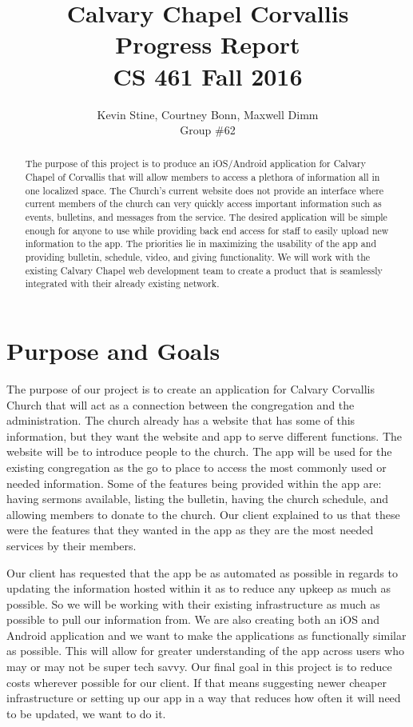 \documentclass[letterpaper,10pt,draftclsnofoot,onecolumn,titlepage]{IEEEtran}
\def\name{Kevin Stine, Courtney Bonn, Maxwell Dimm}
\def\team{Calvary Chapel Corvallis}
\def\grp{Group \#62}
\begin{document}
	\title{\huge \team \\ Progress Report\\ CS 461 Fall 2016}
	\author{\large \name \\ \grp}



	\maketitle

		\begin{abstract}The purpose of this project is to produce an iOS/Android application for Calvary Chapel of Corvallis that will allow members to access a plethora of information all in one localized space.
		The Church's current website does not provide an interface where current members of the church can very quickly access important information such as events, bulletins, and messages from the service.
		The desired application will be simple enough for anyone to use while providing back end access for staff to easily upload new information to the app.
		The priorities lie in maximizing the usability of the app and providing bulletin, schedule, video, and giving functionality.
		We will work with the existing Calvary Chapel web development team to create a product that is seamlessly integrated with their already existing network.
		\end{abstract}

		\clearpage

		\section{Purpose and Goals}
		The purpose of our project is to create an application for Calvary Corvallis Church that will act as a connection between the congregation and the administration.
		The church already has a website that has some of this information, but they want the website and app to serve different functions. 
		The website will be to introduce people to the church.
		The app will be used for the existing congregation as the go to place to access the most commonly used or needed information.
		Some of the features being provided within the app are: having sermons available, listing the bulletin, having the church schedule, and allowing members to donate to the church.
		Our client explained to us that these were the features that they wanted in the app as they are the most needed services by their members.

		Our client has requested that the app be as automated as possible in regards to updating the information hosted within it as to reduce any upkeep as much as possible.
		So we will be working with their existing infrastructure as much as possible to pull our information from.
		We are also creating both an iOS and Android application and we want to make the applications as functionally similar as possible.
		This will allow for greater understanding of the app across users who may or may not be super tech savvy.
		Our final goal in this project is to reduce costs wherever possible for our client.
		If that means suggesting newer cheaper infrastructure or setting up our app in a way that reduces how often it will need to be updated, we want to do it.
\end{document}
